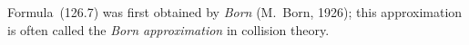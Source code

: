 Formula~(126.7) was first obtained by \emph{Born} (M.~Born, 1926); this approximation is often called the \emph{Born approximation} in collision theory.
